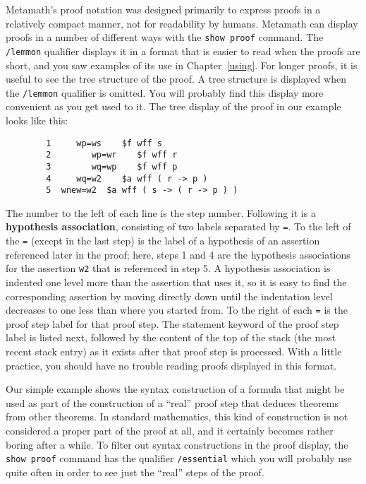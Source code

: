 Metamath's proof notation was designed primarily to express proofs in a
relatively compact manner, not for readability by humans.  Metamath can display
proofs in a number of different ways with the \texttt{show proof} command.  The
\texttt{/lemmon} qualifier displays it in a format that is easier to read when the
proofs are short, and you saw examples of its use in Chapter~\ref{using}.  For
longer proofs, it is useful to see the tree structure of the proof.  A tree
structure is displayed when the \texttt{/lemmon} qualifier is omitted.  You will
probably find this display more convenient as you get used to it. The tree
display of the proof in our example looks like
this:\label{treeproof}
\begin{verbatim}
        1     wp=ws    $f wff s
        2        wp=wr    $f wff r
        3        wq=wp    $f wff p
        4     wq=w2    $a wff ( r -> p )
        5  wnew=w2  $a wff ( s -> ( r -> p ) )
\end{verbatim}
The number to the left of each line is the step number.  Following it is a
{\bf hypothesis association}, consisting of two
labels separated by \texttt{=}.  To the left of the \texttt{=} (except
in the last step) is the label of a hypothesis of an assertion referenced
later in the proof; here, steps 1 and 4 are the hypothesis associations for
the assertion \texttt{w2} that is referenced in step 5.  A hypothesis association
is indented one level more than the assertion that uses it, so it is easy to
find the corresponding assertion by moving directly down until the indentation
level decreases to one less than where you started from.  To the right of each
\texttt{=} is the proof step label for that proof step.  The statement keyword of
the proof step label is listed next, followed by the content of the top of the
stack (the most recent stack entry) as it exists after that proof step is
processed.  With a little practice, you should have no trouble reading proofs
displayed in this format.

Our simple example shows the syntax construction of a formula that might be
used as part of the construction of a ``real'' proof step that deduces
theorems from other theorems.  In standard mathematics, this kind of
construction is not considered a proper part of the proof at all, and it
certainly becomes rather boring after a while.  To filter out syntax
constructions in the proof display, the \texttt{show proof} command has the qualifier \texttt{/essential} which you will probably
use quite often in order to see just the ``real'' steps of
the proof.

